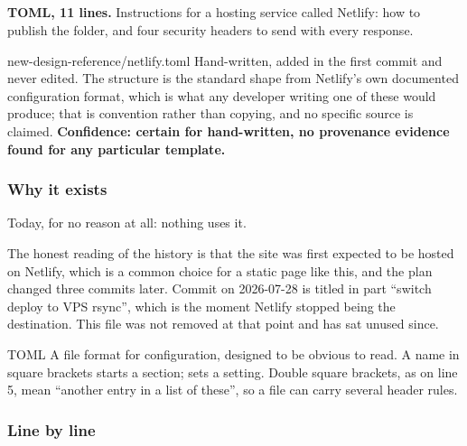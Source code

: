 \subsection{}

\textbf{TOML, 11 lines.} Instructions for a hosting service called Netlify: how
to publish the folder, and four security headers to send with every response.

\begin{provenance}{new-design-reference/netlify.toml}
Hand-written, added in the first commit  and never edited. The
structure is the standard shape from Netlify's own documented configuration
format, which is what any developer writing one of these would produce; that is
convention rather than copying, and no specific source is claimed.
\textbf{Confidence: certain for hand-written, no provenance evidence found for
any particular template.}
\end{provenance}

\subsubsection*{Why it exists}

Today, for no reason at all: nothing uses it.

The honest reading of the history is that the site was first expected to be
hosted on Netlify, which is a common choice for a static page like this, and the
plan changed three commits later. Commit  on 2026-07-28 is titled
in part ``switch deploy to VPS rsync'', which is the moment Netlify stopped being
the destination. This file was not removed at that point and has sat unused since.

\begin{jargon}{TOML}
A file format for configuration, designed to be obvious to read. A name in square
brackets starts a section;  sets a setting. Double square
brackets, as on line 5, mean ``another entry in a list of these'', so a file can
carry several header rules.
\end{jargon}

\subsubsection*{Line by line}

